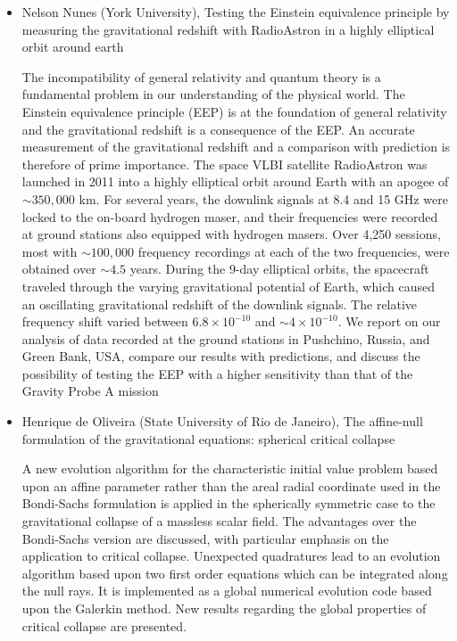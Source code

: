 \documentclass[letterpaper,12pt]{article}
\newcommand{\talk}[2]{{\fontspec{Lato Bold} #1,} {\fontspec{Lato Italic} #2}}
\begin{document}
\begin{itemize}
\item \talk{Nelson Nunes (York University)}{Testing the Einstein equivalence principle by measuring the gravitational redshift with RadioAstron in a highly elliptical orbit around earth}

The incompatibility of general relativity and quantum theory is a fundamental problem in our understanding of the physical world. The Einstein equivalence principle (EEP) is at the foundation of general relativity and the gravitational redshift is a consequence of the EEP. An accurate measurement of the gravitational redshift and a comparison with prediction is therefore of prime importance. The space VLBI satellite RadioAstron was launched in 2011 into a highly elliptical orbit around Earth with an apogee of $\sim 350,000$ km. For several years, the downlink signals at 8.4 and 15 GHz were locked to the on-board hydrogen maser, and their frequencies were recorded at ground stations also equipped with hydrogen masers. Over 4,250 sessions, most with $\sim 100,000$ frequency recordings at each of the two frequencies, were obtained over $\sim 4.5$ years. During the 9-day elliptical orbits, the spacecraft traveled through the varying gravitational potential of Earth, which caused an oscillating gravitational redshift of the downlink signals. The relative frequency shift varied between $6.8 \times 10^{-10}$ and $\sim 4\times 10^{-10}$. We report on our analysis of data recorded at the ground stations in Pushchino, Russia, and Green Bank, USA, compare our results with predictions, and discuss the possibility of testing the EEP with a higher sensitivity than that of the Gravity Probe A mission


\item \talk{Henrique de Oliveira (State University of Rio de Janeiro)}{The affine-null formulation of the gravitational equations: spherical critical collapse }

A new evolution algorithm for the characteristic initial value problem based upon an affine parameter rather than the areal radial coordinate used in the Bondi-Sachs formulation is applied in the spherically symmetric case to the gravitational collapse of a massless scalar field. The advantages over the Bondi-Sachs version are discussed, with particular emphasis on the application to critical collapse. Unexpected quadratures lead to an evolution algorithm based upon two first order equations which can be integrated along the null rays. It is implemented as a global numerical evolution code based upon the Galerkin method. New results regarding the global properties of critical collapse are presented.



\end{itemize}
\end{document}
